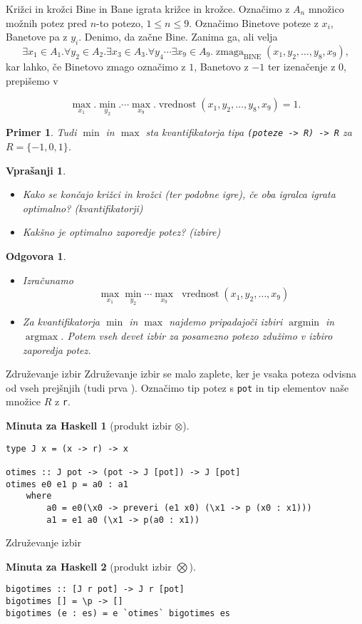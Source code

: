 \documentclass{beamer}
\newtheorem{vpr}{Vprašanji}
\newtheorem{odg}{Odgovora}
\newtheorem{koda}{Minuta za Haskell}
\newtheorem{prim}{Primer}
\def\obs{\exists}
\def\fora{\forall}
\newcommand{\argmin}{\operatorname{argmin}}
\newcommand{\argmax}{\operatorname{argmax}}
\begin{document}
\begin{frame}{Križci in krožci}
Bine in Bane igrata križce in krožce. Označimo z $A_n$ množico možnih potez pred $n$-to potezo, $1\leq n\leq 9$.
Označimo Binetove poteze z $x_i$, Banetove pa z $y_i$. Denimo, da začne Bine.  Zanima ga, ali velja
$$\obs x_1\in A_1.\fora y_2 \in A_2. \obs x_3\in A_3.\fora y_4 \cdots \obs x_9 \in A_9. \operatorname{zmaga}_\text{BINE}(x_1,y_2,\dots, y_8,x_9) \text{,}$$
\pause
kar lahko, če Binetovo zmago označimo z $1$, Banetovo z $-1$ ter izenačenje z $0$, prepišemo v

$$\max_{x_1}. \min_{y_2}. \cdots \max_{x_9}. \operatorname{vrednost}(x_1, y_2,\dots, y_8, x_9) = 1\text{.}$$

\begin{prim}
Tudi $\min$ in $\max$ sta kvantifikatorja tipa \texttt{(poteze -> R) -> R} za $R = \{-1, 0, 1\}$.
\end{prim}

\end{frame}

\begin{frame}
\begin{vpr}
	\begin{itemize}
	\item Kako se končajo križci in krožci (ter podobne igre), če oba igralca igrata optimalno? (kvantifikatorji)
	\item Kakšno je optimalno zaporedje potez? (izbire)
	\end{itemize}
\end{vpr}
\pause
\begin{odg}
	\begin{itemize}
	\item Izračunamo $$\max_{x_1}\min_{y_2}\cdots \max_{x_9}\;\operatorname{vrednost}(x_1, y_2,\dots, x_9)$$
	\item Za kvantifikatorja $\min$ in $\max$ najdemo pripadajoči izbiri $\argmin$ in $\argmax$. Potem vseh devet izbir
	za posamezno potezo zdužimo v izbiro zaporedja potez.
	\end{itemize}
\end{odg}

\end{frame}

\begin{frame}[fragile]{Združevanje izbir}%
Združevanje izbir se malo zaplete, ker je vsaka poteza odvisna od vseh prejšnjih (tudi prva \smiley).
Označimo tip potez s \texttt{pot} in tip elementov naše množice $R$ z \texttt{r}.
\begin{koda}[produkt izbir $\otimes$]
\begin{verbatim}
type J x = (x -> r) -> x

otimes :: J pot -> (pot -> J [pot]) -> J [pot]
otimes e0 e1 p = a0 : a1
    where
        a0 = e0(\x0 -> preveri (e1 x0) (\x1 -> p (x0 : x1)))
        a1 = e1 a0 (\x1 -> p(a0 : x1))
\end{verbatim}
\end{koda}

\end{frame}


\begin{frame}[fragile]{Združevanje izbir}
\begin{koda}[produkt izbir $\bigotimes$]
\begin{verbatim}
bigotimes :: [J r pot] -> J r [pot]
bigotimes [] = \p -> []
bigotimes (e : es) = e `otimes` bigotimes es
\end{verbatim}
\end{koda}
\end{frame}
\end{document}
